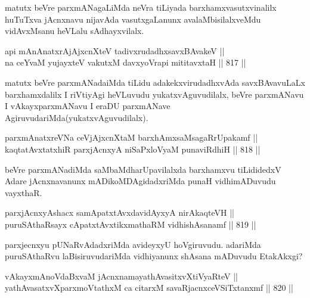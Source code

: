 \begin{artha}
matutx beVre parxmANagaLiMda neVra tiLiyada barxhamxvasutxvinalilx huTuTxva jAcnxnavu nijavAda vasutxgaLanunx avalaMbisilalxveMdu vidAvxMsanu heVLalu sAdhayxvilalx.
\end{artha}


\begin{shl}
api mAnAnatxrAjAjxcnXteV tadivxrudadhxsavxBAvakeV || \\
na ceYvaM yujayxteV vakutxM davxyoVrapi mititavxtaH \hfill || 817 ||  
\end{shl}

\begin{artha}
matutx beVre parxmANadaiMda tiLidu adakekxvirudadhxvAda savxBAvavuLaLx barxhamxdalilx I riVtiyAgi heVLuvudu yukatxvAguvudilalx, beVre parxmANavu I vAkayxparxmANavu I eraDU parxmANave AgiruvudariMda(yukatxvAguvudilalx).
\end{artha}

\begin{shl}
parxmAnatxreVNa ceVjAjxcnXtaM barxhAmxsaMsagaRrUpakamf || \\
kaqtatAvxtatxhiR parxjAcnxyA niSaPxloV\s yaM punaviRdhiH \hfill || 818 ||  
\end{shl}

\begin{artha}
beVre parxmANadiMda saMbaMdharUpavilalxda barxhamxvu tiLididedxV Adare jAcnxnavanunx mADikoMDAgidadxriMda punaH vidhimADuvudu vayxthaR.
\end{artha}


\begin{shl}
parxjAcnxyAshacx samApatxtAvxdavidAyxyA nirAkaqteVH || \\
puruSAthaRsayx cA\s \s patxtAvxtikxmathaRM vidhishAsanamf \hfill || 819 ||  
\end{shl}

\begin{artha}
parxjecnxyu pUNaRvAdadxriMda avideyxyU hoVgiruvudu. adariMda puruSAthaRvu laBisiruvudariMda vidhiyanunx shAsana mADuvudu EtakAkxgi?
\end{artha}


\begin{shl}
vAkayxmAnoVdaBxvaM jAcnxnamayathAvasitxvXtiVyaRteV || \\
yathAvasatxvXparxmoVtathxM ca citarxM savaRjacnxceVSiTxtanxmf \hfill || 820 ||  
\end{shl}

